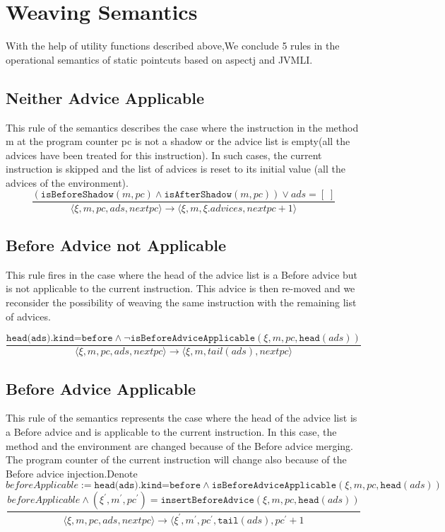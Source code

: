 \section{Weaving Semantics}

With the help of utility functions described above,We conclude 5 rules in the operational semantics of static pointcuts  based on aspectj and JVMLI. 
\subsection{Neither Advice Applicable}
This rule of the semantics describes the case where the instruction in the method m at the program counter pc is not a shadow or the advice list is empty(all the advices have been treated for this instruction). In such cases, the
current instruction is skipped and the list of advices is reset to its initial value (all the advices of the environment).
$$\frac{(\texttt{isBeforeShadow}(m,pc)\wedge \texttt{isAfterShadow}(m,pc))\vee ads=[\;]}
{\langle\xi,m,pc,ads,nextpc\rangle\longrightarrow\langle\xi,m,\xi.advices,nextpc+1\rangle}$$

\subsection{Before Advice not Applicable}
This rule fires in the case where the head of the advice list is a Before advice but is not applicable to the current instruction. This advice is then re-moved and we reconsider the possibility of weaving the same instruction with
the remaining list of advices.

$$\frac{\texttt{head(ads).kind=before}\wedge \neg \texttt{isBeforeAdviceApplicable}(\xi,m,pc,\texttt{head}(ads))}
{\langle\xi,m,pc,ads,nextpc\rangle\longrightarrow\langle\xi,m,tail(ads),nextpc\rangle}$$

\subsection{Before Advice Applicable}
This rule of the semantics represents the case where the head of the
advice list is a Before advice and is applicable to the current instruction. In
this case, the method and the environment are changed because of the Before
advice merging. The program counter of the current instruction will change also
because of the Before advice injection.Denote\\
 $beforeApplicable:=\texttt{head(ads).kind=before}\wedge \texttt{isBeforeAdviceApplicable}(\xi,m,pc,\texttt{head}(ads))$
$$\frac{beforeApplicable\wedge (\xi^\prime,m^\prime,pc^\prime)=\texttt{insertBeforeAdvice}(\xi,m,pc,\texttt{head}(ads))}
{\langle\xi,m,pc,ads,nextpc\rangle\longrightarrow\langle\xi^\prime,m^\prime,pc^\prime,\texttt{tail}(ads),pc^\prime+1}$$

